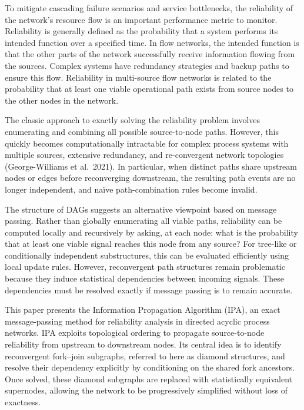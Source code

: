 \documentclass[preprint,12pt]{elsarticle}
\theoremstyle{definition}
\begin{document}
To mitigate cascading failure scenarios and service bottlenecks, the reliability of the network's
resource flow is an important performance metric to monitor. Reliability is generally defined as the
probability that a system performs its intended function over a specified time. In flow networks, the
intended function is that the other parts of the network successfully receive information flowing from
the sources. Complex systems have redundancy strategies and backup paths to ensure this flow. Reliability
in multi-source flow networks is related to the probability that at least one viable operational path
exists from source nodes to the other nodes in the network.

The classic approach to exactly solving the reliability problem involves enumerating and combining all
possible source-to-node paths. However, this quickly becomes computationally intractable for complex
process systems with multiple sources, extensive redundancy, and re-convergent network topologies
(George-Williams et al.\ 2021). In particular, when distinct paths share upstream nodes or edges before
reconverging downstream, the resulting path events are no longer independent, and na\"ive
path-combination rules become invalid.

The structure of DAGs suggests an alternative viewpoint based on message passing. Rather than globally
enumerating all viable paths, reliability can be computed locally and recursively by asking, at each
node: what is the probability that at least one viable signal reaches this node from any source? For
tree-like or conditionally independent substructures, this can be evaluated efficiently using local
update rules. However, reconvergent path structures remain problematic because they induce statistical
dependencies between incoming signals. These dependencies must be resolved exactly if message passing is
to remain accurate.

This paper presents the Information Propagation Algorithm (IPA), an exact message-passing method for
reliability analysis in directed acyclic process networks. IPA exploits topological ordering to propagate
source-to-node reliability from upstream to downstream nodes. Its central idea is to identify
reconvergent fork--join subgraphs, referred to here as diamond structures, and resolve their dependency
explicitly by conditioning on the shared fork ancestors. Once solved, these diamond subgraphs are
replaced with statistically equivalent supernodes, allowing the network to be progressively simplified
without loss of exactness.
\end{document}
